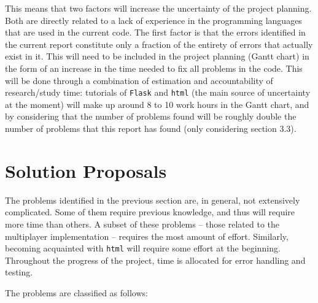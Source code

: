\documentclass[12pt,a4paper]{article}
\begin{document}
This means that two factors will increase the uncertainty of the project planning. Both are directly related to a lack of experience in the programming languages that are used in the current code. The first factor is that the errors identified in the current report constitute only a fraction of the entirety of errors that actually exist in it. This will need to be included in the project planning (Gantt chart) in the form of an increase in the time needed to fix all problems in the code. This will be done through a combination of estimation and accountability of research/study time: tutorials of \texttt{Flask} and \texttt{html} (the main source of uncertainty at the moment) will make up around 8 to 10 work hours in the Gantt chart, and by considering that the number of problems found will be roughly double the number of problems that this report has found (only considering section 3.3). 


\section{Solution Proposals}
\label{sec:sols}

The problems identified in the previous section are, in general, not extensively complicated. Some of them require previous knowledge, and thus will require more time than others. A subset of these problems -- those related to the multiplayer implementation -- requires the most amount of effort. Similarly, becoming acquainted with \texttt{html} will require some effort at the beginning. Throughout the progress of the project, time is allocated for error handling and testing.  

The problems are classified as follows:
\end{document}
